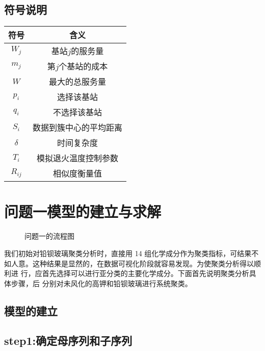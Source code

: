 \documentclass[withoutpreface,bwprint]{cumcmthesis} %
\begin{document}
\subsection{符号说明}
	
	\begin{table}[H]
		\centering
		\setlength{\tabcolsep}{20mm}%
		\begin{tabular}{cc}
			\toprule[1.5pt]
			\textbf{符号}& \textbf{含义} 	       \\  %
			\midrule[1pt]
			$W_{j}$    & 基站${j}$的服务量         \\
			$m_{j}$    & 第${j}$个基站的成本       \\
			$W$        & 最大的总服务量            \\
			$p_{i}$    & 选择该基站  		      \\
			$q_{i}$    & 不选择该基站   		     \\
			$S_{i}$    & 数据到簇中心的平均距离     \\
			$\delta$   & 时间复杂度                \\
			$T_{i}$    & 模拟退火温度控制参数       \\		
			$R_{ij}$   & 相似度衡量值              \\
			\bottomrule[1.5pt]
		\end{tabular}
	\end{table}
	
\section{问题一模型的建立与求解}
	\begin{figure}[H]
		\centering
		\caption{问题一的流程图}
	\end{figure}
我们初始对铅钡玻璃聚类分析时，直接用 14 组化学成分作为聚类指标，可结果不
如人意。这种结果是显然的，在数据可视化阶段就容易发现。为使聚类分析得以顺利进
行，应首先选择可以进行亚分类的主要化学成分。下面首先说明聚类分析具体步骤，后
分别对未风化的高钾和铅钡玻璃进行系统聚类。
 
\subsection{模型的建立}
\subsection*{step1:确定母序列和子序列}
 
\end{document}

